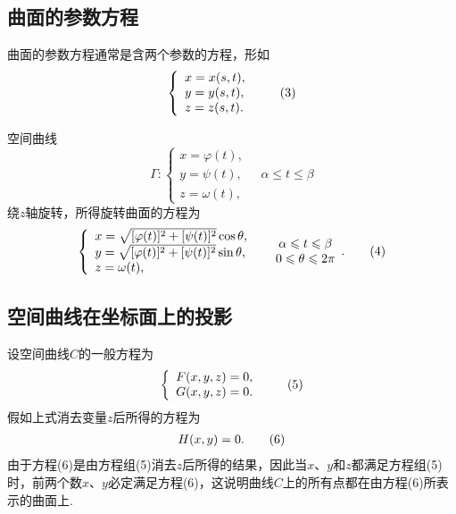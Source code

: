 \subsection{曲面的参数方程}
曲面的参数方程通常是含两个参数的方程，形如\begin{gather}
\left\{ \begin{array}{l}
x=x(s,t), \\
y=y(s,t), \\
z=z(s,t).
\end{array} \right. \tag3
\end{gather}

\begin{example}
空间曲线\[
\Gamma: \left\{ \begin{array}{l}
x=\varphi(t), \\
y=\psi(t), \\
z=\omega(t),
\end{array} \right.
\quad \alpha \leqslant t \leqslant \beta
\]绕\(z\)轴旋转，所得旋转曲面的方程为\begin{gather}
\left\{ \begin{array}{l}
x=\sqrt{[\varphi(t)]^2+[\psi(t)]^2} \cos\theta, \\
y=\sqrt{[\varphi(t)]^2+[\psi(t)]^2} \sin\theta, \\
z=\omega(t),
\end{array} \right.
\quad \begin{array}{c}
\alpha \leqslant t \leqslant \beta \\
0 \leqslant \theta \leqslant 2\pi
\end{array}. \tag4
\end{gather}
\end{example}

\subsection{空间曲线在坐标面上的投影}
设空间曲线\(C\)的一般方程为\begin{gather}
\left\{ \begin{array}{l}
F(x,y,z)=0, \\
G(x,y,z)=0.
\end{array} \right. \tag5
\end{gather}假如上式消去变量\(z\)后所得的方程为\begin{gather}
H(x,y)=0. \tag6
\end{gather}
由于方程(6)是由方程组(5)消去\(z\)后所得的结果，因此当\(x\)、\(y\)和\(z\)都满足方程组(5)时，前两个数\(x\)、\(y\)必定满足方程(6)，这说明曲线\(C\)上的所有点都在由方程(6)所表示的曲面上.

